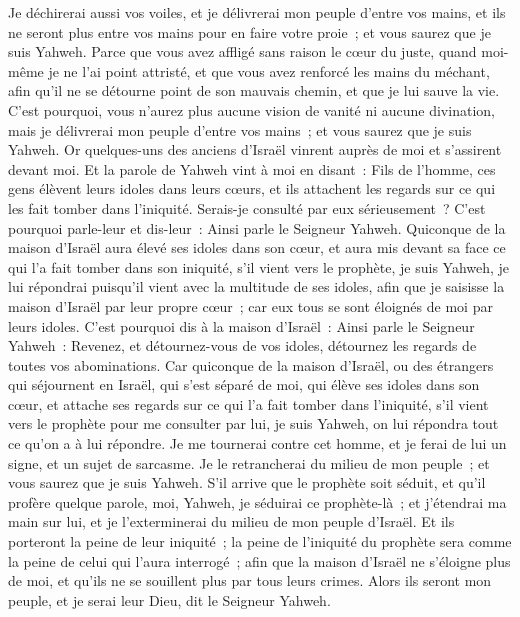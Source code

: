 \begin{multicols}{2}
Je déchirerai aussi vos voiles, et je délivrerai mon peuple d'entre vos mains, et ils ne seront plus entre vos mains pour en faire votre proie~; et vous saurez que je suis Yahweh.
Parce que vous avez affligé sans raison le cœur du juste, quand moi-même je ne l'ai point attristé, et que vous avez renforcé les mains du méchant, afin qu'il ne se détourne point de son mauvais chemin, et que je lui sauve la vie.
C'est pourquoi, vous n'aurez plus aucune vision de vanité ni aucune divination, mais je délivrerai mon peuple d'entre vos mains~; et vous saurez que je suis Yahweh.
\VerseOne{}Or quelques-uns des anciens d'Israël vinrent auprès de moi et s'assirent devant moi.
Et la parole de Yahweh vint à moi en disant~:
Fils de l'homme, ces gens élèvent leurs idoles dans leurs cœurs, et ils attachent les regards sur ce qui les fait tomber dans l'iniquité. Serais-je consulté par eux sérieusement~?
C'est pourquoi parle-leur et dis-leur~: Ainsi parle le Seigneur Yahweh. Quiconque de la maison d'Israël aura élevé ses idoles dans son cœur, et aura mis devant sa face ce qui l'a fait tomber dans son iniquité, s'il vient vers le prophète, je suis Yahweh, je lui répondrai puisqu'il vient avec la multitude de ses idoles,
afin que je saisisse la maison d'Israël par leur propre cœur~; car eux tous se sont éloignés de moi par leurs idoles.
C'est pourquoi dis à la maison d'Israël~: Ainsi parle le Seigneur Yahweh~: Revenez, et détournez-vous de vos idoles, détournez les regards de toutes vos abominations.
Car quiconque de la maison d'Israël, ou des étrangers qui séjournent en Israël, qui s'est séparé de moi, qui élève ses idoles dans son cœur, et attache ses regards sur ce qui l'a fait tomber dans l'iniquité, s'il vient vers le prophète pour me consulter par lui, je suis Yahweh, on lui répondra tout ce qu'on a à lui répondre.
Je me tournerai contre cet homme, et je ferai de lui un signe, et un sujet de sarcasme. Je le retrancherai du milieu de mon peuple~; et vous saurez que je suis Yahweh.
S'il arrive que le prophète soit séduit, et qu'il profère quelque parole, moi, Yahweh, je séduirai ce prophète-là~; et j'étendrai ma main sur lui, et je l'exterminerai du milieu de mon peuple d'Israël.
Et ils porteront la peine de leur iniquité~; la peine de l'iniquité du prophète sera comme la peine de celui qui l'aura interrogé~;
afin que la maison d'Israël ne s'éloigne plus de moi, et qu'ils ne se souillent plus par tous leurs crimes. Alors ils seront mon peuple, et je serai leur Dieu, dit le Seigneur Yahweh.

\end{multicols}
